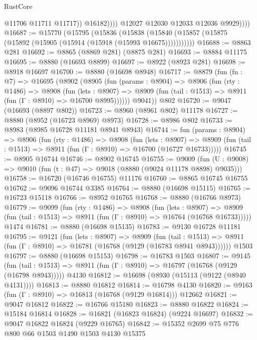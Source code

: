 \begin{lexlean}{RustCore}
\begin{coremodule}
                        @11706
                        @11711
                        @11717))
                    @16182))))
            @12027
            @12030
            @12033
            @12036
            @9929))))
@16687 := @15770
    (@15795
      (@15836
        (@15838 (@15840 (@15857 (@15875 (@15892 (@15905 (@15914 (@15918 (@15993 @16675)))))))))))
@16688 := @8863 @281
@16692 := @8865 (@8869 @281) (@8875 @281)
@16693 := @8884 @11175
@16695 := @8880 (@16693 @8899)
@16697 := @8922 (@8923 @281)
@16698 := @8918 @16697
@16700 := @8880 (@16698 @8948)
@16717 := @8879
    (fun (fn : @7) =>
    @16695
      (@8902
        (@8905
          (fun (params : @8904) =>
          @8906
            (fun (rty : @1486) =>
            @8908
              (fun (lets : @8907) =>
              @8909 (fun (tail : @1513) => @8911 (fun (Γ : @8910) => @16700 @8995))))))
        @9041))
    @802
@16720 := @9047 (@16693 (@8897 @802))
@16723 := @8960 (@8961 @802) @11178
@16727 := @8880 (@8952 (@16723 @8969) @8973)
@16728 := @8986 @802
@16733 := @8983 (@8985 @16728 @11181 @8941 @8943)
@16744 := fun (params : @8904) =>
  @8906
    (fun (rty : @1486) =>
    @8908
      (fun (lets : @8907) =>
      @8909 (fun (tail : @1513) => @8911 (fun (Γ : @8910) => @16700 (@16727 @16733)))))
@16745 := @8905 @16744
@16746 := @8902 @16745
@16755 := @9009
    (fun (U : @9008) => @9010 (fun (t : @47) => @9018 (@8880 (@9024 @11178 @8898) @9035)))
@16758 := @16720 (@16746 @16755) @11176
@16760 := @8865 @16745 @16755
@16762 := @9096 @16744 @3385
@16764 := @8880 (@16698 @15115)
@16765 := @16723 @15118
@16766 := @8952 @16765
@16768 := @8880 (@16766 @8973)
@16779 := @9099
    (fun (rty : @1486) =>
    @8908
      (fun (lets : @8907) =>
      @8909 (fun (tail : @1513) => @8911 (fun (Γ : @8910) => @16764 (@16768 @16733)))))
    @1474
@16781 := @8880 (@16698 @15135)
@16783 := @9130 @16728 @11181
@16795 := @9121
    (fun (lets : @8907) =>
    @8909
      (fun (tail : @1513) =>
      @8911 (fun (Γ : @8910) => @16781 (@16768 (@9129 (@16783 @8941 @8943))))))
    @1503
@16797 := @8880 (@16698 @15153)
@16798 := @16783 @1503
@16807 := @9145
    (fun (tail : @1513) => @8911 (fun (Γ : @8910) => @16797 (@16768 (@9129 (@16798 @8943)))))
    @4130
@16812 := @16698 (@8930 (@15113 (@9122 (@8940 @4131))))
@16813 := @8880 @16812
@16814 := @16798 @4130
@16820 := @9163 (fun (Γ : @8910) => @16813 (@16768 (@9129 @16814))) @12662
@16821 := @9047 @16812
@16822 := @16766 @15180
@16823 := @8880 @16822
@16824 := @15184 @16814
@16828 := @16821 (@16823 @16824) (@9224 @16697)
@16832 := @9047 @16822 @16824 (@9229 @16765)
@16842 := @15352 @2699 @75 @776 @800 @66 @1503 @1490 @1503 @4130 @15375

\end{coremodule}
\end{lexlean}
